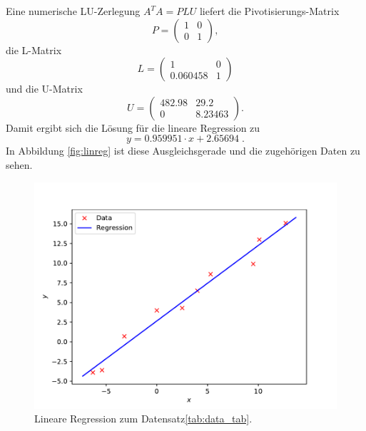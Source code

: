 \documentclass{article}
\begin{document}
Eine numerische LU-Zerlegung $A^TA = PLU$ liefert die Pivotisierungs-Matrix
\[
P = 
\begin{pmatrix}
1 & 0\\
0 & 1
\end{pmatrix},
\]
die L-Matrix
\[
L = \begin{pmatrix}
       1    &   0\\
0.060458    &   1
\end{pmatrix}
\]
und die U-Matrix
\[
U = \begin{pmatrix}
 482.98 &  29.2\\
      0 & 8.23463
\end{pmatrix}.
\]
Damit ergibt sich die Lösung für die lineare Regression zu
\[
y = 0.959951\cdot x + 2.65694\; .
\]
In Abbildung \ref{fig:linreg} ist diese Ausgleichsgerade und die zugehörigen Daten zu sehen.
\begin{figure}
    \centering
    \includegraphics[width=\textwidth]{A2/build/Regression.pdf}
    \caption{Lineare Regression zum Datensatz\ref{tab:data_tab}.}
    \label{fig:my_label}
\end{figure}
\end{document}
